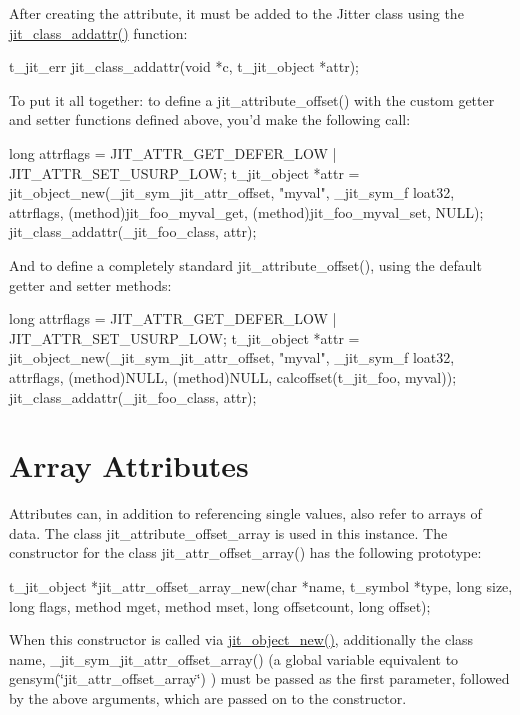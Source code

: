 After creating the attribute, it must be added to the Jitter class using the \hyperlink{group__classmod_ga37e39db544b4d73596da1557e6c7563a}{jit\_\-class\_\-addattr()} function:


\begin{DoxyCode}
t_jit_err jit_class_addattr(void *c, t_jit_object *attr);
\end{DoxyCode}


To put it all together: to define a jit\_\-attribute\_\-offset() with the custom getter and setter functions defined above, you'd make the following call:


\begin{DoxyCode}
long attrflags = JIT_ATTR_GET_DEFER_LOW | JIT_ATTR_SET_USURP_LOW;
t_jit_object *attr = jit_object_new(_jit_sym_jit_attr_offset, "myval", _jit_sym_f
      loat32, attrflags, 
   (method)jit_foo_myval_get, (method)jit_foo_myval_set, NULL);
jit_class_addattr(_jit_foo_class, attr);
\end{DoxyCode}


And to define a completely standard jit\_\-attribute\_\-offset(), using the default getter and setter methods:


\begin{DoxyCode}
long attrflags = JIT_ATTR_GET_DEFER_LOW | JIT_ATTR_SET_USURP_LOW;
t_jit_object *attr = jit_object_new(_jit_sym_jit_attr_offset, "myval", _jit_sym_f
      loat32, attrflags, 
   (method)NULL, (method)NULL, calcoffset(t_jit_foo, myval));
jit_class_addattr(_jit_foo_class, attr);
\end{DoxyCode}
\hypertarget{chapter_jit_objectmodel_chapter_jit_objectmodel_arrayattrs}{}\section{Array Attributes}\label{chapter_jit_objectmodel_chapter_jit_objectmodel_arrayattrs}
Attributes can, in addition to referencing single values, also refer to arrays of data. The class jit\_\-attribute\_\-offset\_\-array is used in this instance. The constructor for the class jit\_\-attr\_\-offset\_\-array() has the following prototype:


\begin{DoxyCode}
t_jit_object *jit_attr_offset_array_new(char *name, t_symbol *type, long size, 
   long flags, method mget, method mset, long offsetcount, long offset);
\end{DoxyCode}


When this constructor is called via \hyperlink{group__objectmod_gabde2eb49750992ec4125af862b402342}{jit\_\-object\_\-new()}, additionally the class name, \_\-jit\_\-sym\_\-jit\_\-attr\_\-offset\_\-array() (a global variable equivalent to gensym(\char`\"{}jit\_\-attr\_\-offset\_\-array\char`\"{}) ) must be passed as the first parameter, followed by the above arguments, which are passed on to the constructor.


